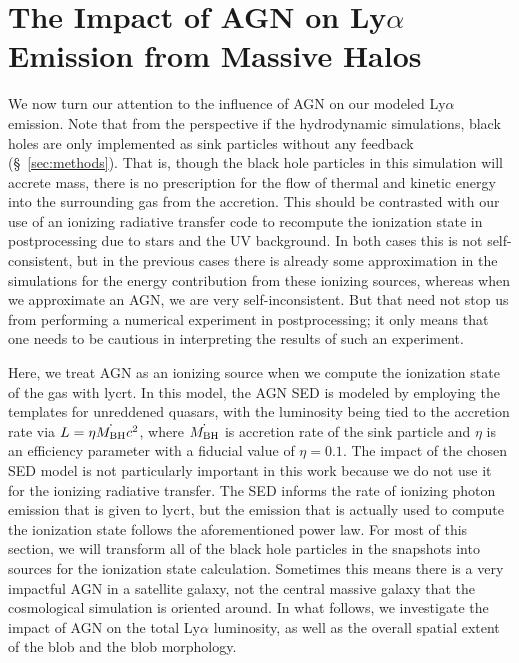 \chapter{The Impact of AGN on Ly\texorpdfstring{$\alpha$}{a} Emission from Massive Halos}
\label{sec:agn}

We now turn our attention to the influence of AGN on our modeled Ly$\alpha$ emission.
Note that from the perspective if the hydrodynamic simulations, black holes are only implemented as sink particles without any feedback (\S~\ref{sec:methods}).
That is, though the black hole particles in this simulation will accrete mass, there is no prescription for the flow of thermal and kinetic energy into the surrounding gas from the accretion.
This should be contrasted with our use of an ionizing radiative transfer code to recompute the ionization state in postprocessing due to stars and the UV background.
In both cases this is not self-consistent, but in the previous cases there is already some approximation in the simulations for the energy contribution from these ionizing sources, whereas when we approximate an AGN, we are very self-inconsistent.
But that need not stop us from performing a numerical experiment in postprocessing; it only means that one needs to be cautious in interpreting the results of such an experiment.

Here, we treat AGN as an ionizing source when we compute the ionization state of the gas with {\sc lycrt}.
In this model, the AGN SED is modeled by employing the \citet*{Hopkins2007} templates for unreddened quasars, with the luminosity being tied to the accretion rate via $L = \eta \dot{M_{\rm BH}} c^2$, where $\dot{M_{\rm BH}}$ is accretion rate of the sink particle and $\eta$ is an efficiency parameter with a fiducial value of $\eta = 0.1$.
The impact of the chosen SED model is not particularly important in this work because we do not use it for the ionizing radiative transfer.
The SED informs the rate of ionizing photon emission that is given to {\sc lycrt}, but the emission that is actually used to compute the ionization state follows the aforementioned power law.
For most of this section, we will transform all of the black hole particles in the snapshots into sources for the ionization state calculation.
Sometimes this means there is a very impactful AGN in a satellite galaxy, not the central massive galaxy that the cosmological simulation is oriented around.
In what follows, we investigate the impact of AGN on the total Ly$\alpha$ luminosity, as well as the overall spatial extent of the blob and the blob morphology.

